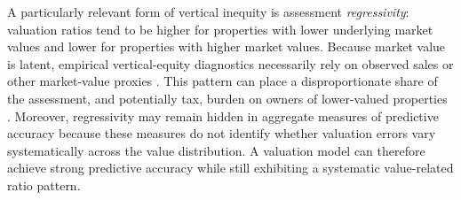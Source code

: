 \documentclass[10pt]{article}
\theoremstyle{definition}
\newcommand{\1}{\mathbf{1}}
\begin{document}
{A particularly relevant form of vertical inequity is assessment \emph{regressivity}: valuation ratios tend to be higher for properties with lower underlying market values and lower for properties with higher market values. Because market value is latent, empirical vertical-equity diagnostics necessarily rely on observed sales or other market-value proxies \cite{IAAO2026ExposureRatio}. This pattern can place a disproportionate share of the assessment, and potentially tax, burden on owners of lower-valued properties \cite{McMillen2020,Berry2021,AvenancioLeonHoward2022}. Moreover, regressivity may remain hidden in aggregate measures of predictive accuracy because these measures do not identify whether valuation errors vary systematically across the value distribution. A valuation model can therefore achieve strong predictive accuracy while still exhibiting a systematic value-related ratio pattern.}


\end{document}
